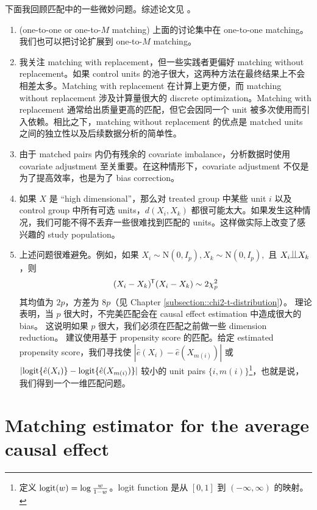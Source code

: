 下面我回顾匹配中的一些微妙问题。综述论文见 \citet{stuart2010matching}。
\begin{enumerate}
\item
(one-to-one or one-to-$M$ matching)
上面的讨论集中在 one-to-one matching。我们也可以把讨论扩展到 one-to-$M$ matching。


\item
我关注 matching with replacement，但一些实践者更偏好 matching without replacement。如果 control units 的池子很大，这两种方法在最终结果上不会相差太多。Matching with replacement 在计算上更方便，而 matching without replacement 涉及计算量很大的 discrete optimization。Matching with replacement 通常给出质量更高的匹配，但它会因同一个 unit 被多次使用而引入依赖。相比之下，matching without replacement 的优点是 matched units 之间的独立性以及后续数据分析的简单性。


\item
由于 matched pairs 内仍有残余的 covariate imbalance，分析数据时使用 covariate adjustment 至关重要。在这种情形下，covariate adjustment 不仅是为了提高效率，也是为了 bias correction。

\item
如果 $X$ 是 ``high dimensional''，那么对 treated group 中某些 unit $i$ 以及 control group 中所有可选 units，$d(X_i ,X_k)$ 都很可能太大。如果发生这种情况，我们可能不得不丢弃一些很难找到匹配的 units。这样做实际上改变了感兴趣的 study population。


\item
上述问题很难避免。例如，如果 $X_i \sim \text{N}(0, I_p), X_k \sim\text{N}(0, I_p) ,$ 且 $X_i \ind X_k$，则
$$
(X_i - X_k)^{\mkern-1.5mu\mathsf{T}} (X_i - X_k) \sim    2 \chi^2_p
$$ 
其均值为 $2p$，方差为 $8p$（见 Chapter \ref{subsection::chi2-t-distribution}）。
理论表明，当 $p$ 很大时，不完美匹配会在 causal effect estimation 中造成很大的 bias。
这说明如果 $p$ 很大，我们必须在匹配之前做一些 dimension reduction。
\citet{rosenbaum1983central} 建议使用基于 propensity score 的匹配。给定 estimated propensity score，我们寻找使 $ |  \hat{e}(X_i) -  \hat{e}(X_{m(i)})  |$ 或 $| \textup{logit}\{ \hat{e}(X_i)\} - \textup{logit}\{ \hat{e}(X_{m(i)}) \} | $ 较小的 unit pairs $\{ i, m(i)\}$\footnote{定义 $\textup{logit}(w) = \log \frac{w}{1-w}$。logit function 是从 $[0,1]$ 到 $(-\infty, \infty)$ 的映射。}，也就是说，我们得到一个一维匹配问题。
\end{enumerate}

 

\section{Matching estimator for the average causal effect}

